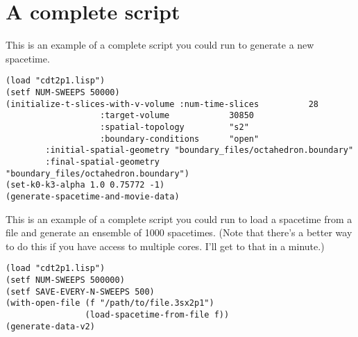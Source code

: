 \documentclass{article}
\begin{document}
\section{A complete script}
This is an example of a complete script you could run to generate a
new spacetime.
\begin{lstlisting}
(load "cdt2p1.lisp")
(setf NUM-SWEEPS 50000)
(initialize-t-slices-with-v-volume :num-time-slices          28
				   :target-volume            30850
				   :spatial-topology         "s2"
				   :boundary-conditions      "open"
        :initial-spatial-geometry "boundary_files/octahedron.boundary"
        :final-spatial-geometry   "boundary_files/octahedron.boundary")
(set-k0-k3-alpha 1.0 0.75772 -1)
(generate-spacetime-and-movie-data)
\end{lstlisting}

This is an example of a complete script you could run to load a
spacetime from a file and generate an ensemble of 1000
spacetimes. (Note that there's a better way to do this if you have
access to multiple cores. I'll get to that in a minute.)
\begin{lstlisting}
(load "cdt2p1.lisp")
(setf NUM-SWEEPS 500000)
(setf SAVE-EVERY-N-SWEEPS 500)
(with-open-file (f "/path/to/file.3sx2p1")
                (load-spacetime-from-file f))
(generate-data-v2)
\end{lstlisting}
\end{document}
